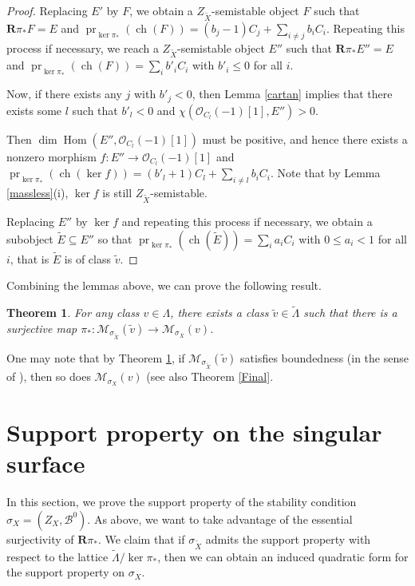\documentclass[12pt]{amsart}
\newtheorem{theorem}{Theorem}[section]
\theoremstyle{definition}
\DeclareMathOperator{\Hom}{Hom}
\DeclareMathOperator{\ch}{ch}
\DeclareMathOperator{\pr}{pr}
\begin{document}
\begin{proof}
Replacing $E'$ by $F$,
we obtain a $Z_{\widetilde{X}}$-semistable object $F$ such that $\mathbf{R}\pi_\ast F=E$ and $\displaystyle \pr_{\ker \pi_\ast}(\ch(F)) = (b_j-1)C_j+\sum_{i\neq j} b_i C_i$.
Repeating this process if necessary,
we reach a $Z_{\widetilde{X}}$-semistable object $E''$ such that $\mathbf{R}\pi_\ast E''=E$ and $\displaystyle \pr_{\ker \pi_\ast}(\ch(F)) = \sum_{i} b'_i C_i$ with $b'_i \leq 0$ for all $i$.

Now, if there exists any $j$ with $b'_j <0$, then Lemma \ref{cartan} implies that there exists some $l$ such that $b'_l<0$ and $\chi(\mathcal{O}_{C_l}(-1)[1],E'')>0$.

Then $\dim \Hom(E'',\mathcal{O}_{C_l}(-1)[1])$ must be positive,
and hence there exists a nonzero morphism $f\colon E''\longrightarrow \mathcal{O}_{C_l}(-1)[1]$ and $\displaystyle \pr_{\ker \pi_\ast}(\ch(\ker f)) = (b'_l+1)C_l+\sum_{i\neq l} b_i C_i$.
Note that by Lemma \ref{massless}(i), $\ker f$ is still $Z_{\widetilde{X}}$-semistable.

Replacing $E''$ by $\ker f$ and repeating this process if necessary, we obtain a subobject $\widetilde{E}\subseteq E''$ so that $\displaystyle \pr_{\ker \pi_\ast}(\ch(\widetilde{E}))= \sum_i a_i C_i$ with $0\leq a_i<1$ for all $i$,
that is $\widetilde{E}$ is of class $\widetilde{v}$.
\end{proof}


Combining the lemmas above, we can prove the following result.
\begin{theorem}\label{surjmoduli}
For any class $v \in \Lambda$, there exists a class $\widetilde{v} \in \widetilde{\Lambda}$ such that there is a surjective map $\pi_\ast \colon \mathcal{M}_{\sigma_{\widetilde{X}}}(\widetilde{v}) \longrightarrow \mathcal{M}_{\sigma_X}(v)$.
\end{theorem}

One may note that by Theorem \ref{surjmoduli}, if $\mathcal{M}_{\sigma_{\widetilde{X}}}(\widetilde{v})$ satisfies boundedness (in the sense of \cite[Definition 9.4]{BLM+}), 
then so does $\mathcal{M}_{\sigma_X}(v)$ (see also Theorem \ref{Final}.

\section{Support property on the singular surface}
In this section, we prove the support property of the stability condition $\sigma_X =(Z_X,\mathcal{B}^0)$.
As above, we want to take advantage of the essential surjectivity of $\mathbf{R} \pi_\ast$.
We claim that if $\sigma_{\widetilde{X}}$ admits the support property with respect to the lattice $\widetilde{\Lambda}/ \ker \pi_\ast$,
then we can obtain an induced quadratic form for the support property on $\sigma_X$.
\end{document}

